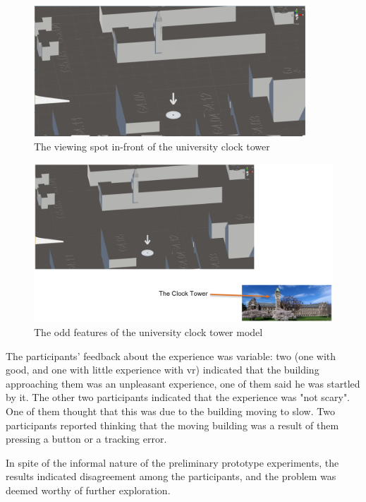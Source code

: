 \begin{figure}
	\centering
	\includegraphics[width=0.7\linewidth]{figures/placeholders/prototype2_viewving_spot}
	\caption{The viewing spot in-front of the university clock tower}
	\label{fig:prototype2viewvingspot}
\end{figure}
\begin{figure}
	\centering
	\includegraphics[width=0.7\linewidth]{figures/placeholders/prototype2_clocktower_odd_features}
	\caption{The odd features of the university clock tower model}
	\label{fig:prototype2clocktoweroddfeatures}
\end{figure}


The participants' feedback about the experience was variable: two (one with good, and one with little experience with \gls{vr}) indicated that the building approaching them was an unpleasant experience, one of them said he was startled by it. The other two participants indicated that the experience was "not scary". One of them thought that this was due to the building moving to slow. Two participants reported thinking that the moving building was a result of them pressing a button or a tracking error.	

In spite of the informal nature of the preliminary prototype experiments, the results indicated disagreement among the participants, and the problem was deemed worthy of further exploration.


